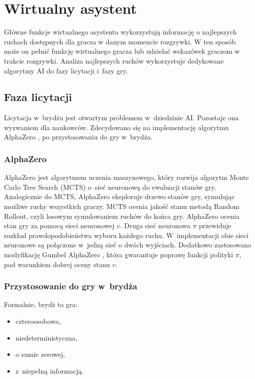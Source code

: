 \section{Wirtualny asystent}

Główne funkcje wirtualnego asystenta wykorzystują informację o najlepszych ruchach
dostępnych dla gracza w danym momencie rozgrywki.
W ten sposób może on pełnić funkcję wirtualnego gracza lub
udzielać wskazówek graczom w trakcie rozgrywki.
Analiza najlepszych ruchów wykorzystuje dedykowane algorytmy AI
do fazy licytacji i~fazy gry.

\subsection{Faza licytacji}

Licytacja w~brydżu jest otwartym problemem w~dziedzinie AI.
Pozostaje ona wyzwaniem dla naukowców.
Zdecydowano się na implementację algorytmu AlphaZero \cite{AlphaZeroPaper},
po przystosowaniu do gry w~brydża.

\subsubsection{AlphaZero}

AlphaZero jest algorytmem uczenia maszynowego, który rozwija
algorytm Monte Carlo Tree Search (MCTS) o~sieć neuronową do ewaluacji
stanów gry.
Analogicznie do MCTS, AlphaZero eksploruje drzewo stanów gry,
symulując możliwe ruchy wszystkich graczy.
MCTS ocenia jakość stanu metodą Random Rollout, czyli
losowym symulowaniem ruchów do końca gry.
AlphaZero ocenia stan gry za pomocą sieci neuronowej $v$.
Druga sieć neuronowa $\pi$ przewiduje rozkład
prawdopodobieństwa wyboru każdego ruchu.
W~implementacji obie sieci neuronowe są połączone w~jedną
sieć o dwóch wyjściach.
Dodatkowo zastosowano modyfikację
Gumbel AlphaZero \cite{GumbelAZ},
która gwarantuje poprawę funkcji polityki $\pi$, pod warunkiem
dobrej oceny stanu $v$.


\subsubsection{Przystosowanie do gry w~brydża}

Formalnie, brydż to gra:
\begin{itemize}
  \item czteroosobowa,
  \item niedeterministyczna,
  \item o sumie zerowej,
  \item z~niepełną informacją.
\end{itemize}

